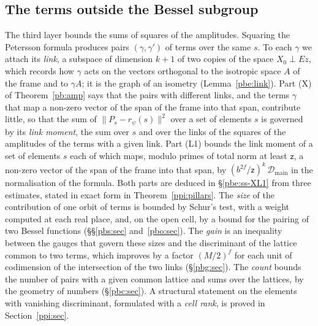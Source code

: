 \documentclass[10pt]{amsart}
\theoremstyle{definition}
\theoremstyle{remark}
\providecommand{\pbDmain}{\mathcal D_{\mathrm{main}}}
\providecommand{\pbrpsi}{r_\psi}
\begin{document}
\subsection*{The terms outside the Bessel subgroup}
The third layer bounds the sums of squares of the amplitudes. Squaring the Petersson formula
produces pairs $(\gamma,\gamma')$ of terms over the same $s$. To each $\gamma$ we attach its
\emph{link}, a subspace of dimension $k+1$ of two copies of the space $X_0\perp Ez$, which records
how $\gamma$ acts on the vectors orthogonal to the isotropic space $A$ of the frame and to
$\gamma A$; it is the graph of an isometry (Lemma~\ref{pbe:link}). Part (X) of
Theorem~\ref{pb:amp} says that the pairs with different links, and the terms $\gamma$ that map a
non-zero vector of the span of the frame into that span, contribute little, so that the sum of
$\|P_s-\pbrpsi(s)\|^2$ over a set of elements $s$ is governed by its \emph{link moment}, the sum
over $s$ and over the links of the squares of the amplitudes of the terms with a given link. Part
(L1) bounds the link moment of a set of elements $s$ each of which maps, modulo primes of total
norm at least $\mathsf z$, a non-zero vector of the span of the frame into that span, by
$(b^{2f}/\mathsf z)^k\,\pbDmain$ in the normalisation of the formula. Both parts are deduced in
\S\ref{pbe:ss-XL1} from three estimates, stated in exact form in Theorem~\ref{ppi:pillars}. The
\emph{size} of the contribution of one orbit of terms is bounded by Schur's test, with a weight
computed at each real place, and, on the open cell, by a bound for the pairing of two Bessel
functions (\S\S\ref{pbs:sec} and~\ref{pbo:sec}). The \emph{gain} is an inequality between the
gauges that govern these sizes and the discriminant of the lattice common to two terms, which improves by a factor $(M/2)^{f}$ for
each unit of codimension of the intersection of the two links (\S\ref{pbg:sec}). The \emph{count} bounds the number of pairs with a given common lattice
and sums over the lattices, by the geometry of numbers (\S\ref{pbc:sec}). A structural
statement on the elements with vanishing discriminant, formulated with a \emph{cell rank}, is
proved in Section~\ref{ppi:sec}.
\end{document}
